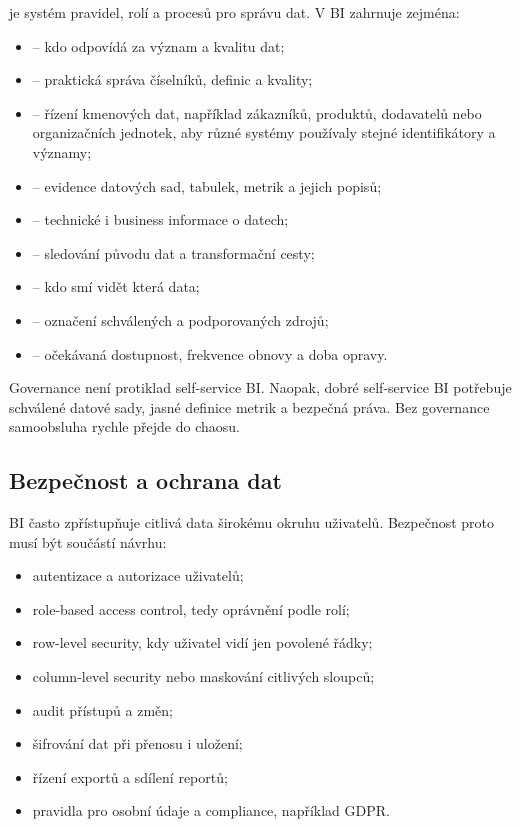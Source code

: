  je systém pravidel, rolí a procesů pro správu dat. V BI zahrnuje zejména:
\begin{itemize}
  \item {} -- kdo odpovídá za význam a kvalitu dat;
  \item {} -- praktická správa číselníků, definic a kvality;
  \item {} -- řízení kmenových dat, například zákazníků, produktů,
  dodavatelů nebo organizačních jednotek, aby různé systémy používaly stejné identifikátory a významy;
  \item {} -- evidence datových sad, tabulek, metrik a jejich popisů;
  \item {} -- technické i business informace o datech;
  \item {} -- sledování původu dat a transformační cesty;
  \item {} -- kdo smí vidět která data;
  \item {} -- označení schválených a podporovaných zdrojů;
  \item {} -- očekávaná dostupnost, frekvence obnovy a doba opravy.
\end{itemize}

Governance není protiklad self-service BI. Naopak, dobré self-service BI potřebuje schválené datové sady, jasné definice metrik a bezpečná práva. Bez governance samoobsluha rychle přejde do chaosu.

\subsection{Bezpečnost a ochrana dat}
BI často zpřístupňuje citlivá data širokému okruhu uživatelů. Bezpečnost proto musí být součástí návrhu:
\begin{itemize}
  \item autentizace a autorizace uživatelů;
  \item role-based access control, tedy oprávnění podle rolí;
  \item row-level security, kdy uživatel vidí jen povolené řádky;
  \item column-level security nebo maskování citlivých sloupců;
  \item audit přístupů a změn;
  \item šifrování dat při přenosu i uložení;
  \item řízení exportů a sdílení reportů;
  \item pravidla pro osobní údaje a compliance, například GDPR.
\end{itemize}

